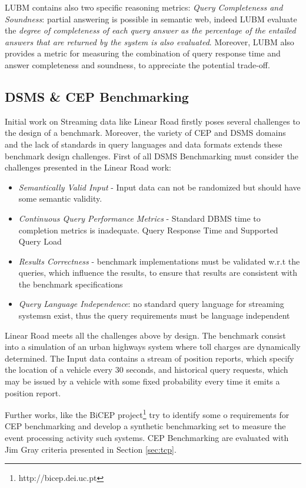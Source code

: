 LUBM contains also two specific reasoning metrics: \textit{Query Completeness and Soundness}: partial answering is possible in semantic web, indeed LUBM evaluate the \textit{degree of completeness of each query answer as the percentage of the entailed answers that are returned by the system is also evaluated}. Moreover, LUBM also provides a metric for measuring the combination of  query response time and answer completeness and soundness, to  appreciate the potential trade-off.

\subsection{DSMS \& CEP Benchmarking}\label{sec:linear-road}

Initial work on Streaming data like Linear Road \cite{arasu2004linear} firstly poses  several challenges to the design of a benchmark.  Moreover, the variety of CEP and DSMS domains and the lack of standards in query languages and data formats extends these benchmark design challenges. First of all DSMS Benchmarking must consider the challenges presented in the Linear Road work:
\begin{itemize}
\item  \textit{Semantically Valid Input} -  Input data can not be randomized but should have some semantic validity.
\item  \textit{Continuous Query Performance Metrics} - Standard DBMS time to completion metrics is inadequate. Query Response Time and Supported Query Load 
\item  \textit{Results Correctness} - benchmark implementations must be validated w.r.t the queries, which influence the results, to ensure that results are consistent with the benchmark specifications 
\item  \textit{Query Language Independence}: no standard query language for streaming systemsn exist, thus the query requirements must be language independent
\end{itemize}

Linear Road meets all the challenges above by design. The benchmark consist into a simulation of  an urban highways system where toll charges are dynamically determined. The Input data contains a stream of position reports, which specify the location of a vehicle every 30 seconds, and historical query requests, which may be issued by a vehicle with some fixed probability every time it emits a position report.

Further works, like the BiCEP project\footnote{http://bicep.dei.uc.pt} try to identify some o requirements for CEP benchmarking and develop a synthetic benchmarking set to measure the event processing activity such systems. CEP Benchmarking are evaluated with Jim Gray criteria presented in Section \ref{sec:tcp}. 

